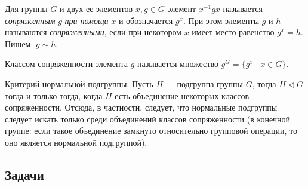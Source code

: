 Для группы $G$ и двух ее элементов $x,g\in G$ элемент $x^{-1}gx$ называется \textit{сопряженным} $g$ \textit{при помощи} $x$ и обозначается $g^x$. При этом элементы $g$ и $h$ называются \textit{сопряженными}, если при некотором $x$ имеет место равенство $g^x=h$. Пишем: $g\sim h$.

Классом сопряженности элемента $g$ называется множество $g^G=\{g^x\mid x\in G\}$.

Критерий нормальной подгруппы. Пусть $H$ --- подгруппа группы $G$, тогда $H\triangleleft G$ тогда и только тогда, когда $H$ есть объединение некоторых классов сопряженности. Отсюда, в частности, следует, что нормальные подгруппы следует искать только среди объединений классов сопряженности (в конечной группе: если такое объединение замкнуто относительно групповой операции, то оно является нормальной подгруппой).


\subsection*{Задачи}

